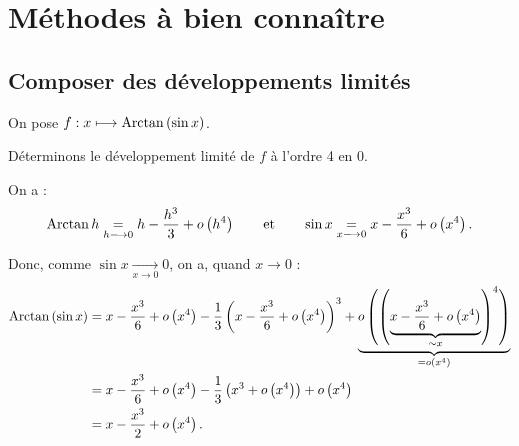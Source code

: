 \section{Méthodes à bien connaître}

\subsection{Composer des développements limités}

\begin{ex}
On pose \(f:x\longmapsto\operatorname{Arctan}\left(\sin x\right)\).

Déterminons le développement limité de \(f\) à l'ordre 4 en \(0\).

On a : \[\operatorname{Arctan} h\underset{h\longrightarrow0}{=}h-\dfrac{h^3}{3}+o\left(h^4\right)\qquad\text{et}\qquad\sin x\underset{x\longrightarrow0}{=}x-\dfrac{x^3}{6}+o\left(x^4\right).\]

Donc, comme \(\sin x\xrightarrow[x\to0]{}0\), on a, quand \(x\to0\) : \[\begin{aligned}
\operatorname{Arctan}\left(\sin x\right)&=x-\dfrac{x^3}{6}+o\left(x^4\right)-\dfrac{1}{3}\left(x-\dfrac{x^3}{6}+o\left(x^4\right)\right)^3+\underbrace{o\left(\left(\underbrace{x-\dfrac{x^3}{6}+o\left(x^4\right)}_{\sim x}\right)^4\right)}_{=o\left(x^4\right)} \\
&=x-\dfrac{x^3}{6}+o\left(x^4\right)-\dfrac{1}{3}\left(x^3+o\left(x^4\right)\right)+o\left(x^4\right) \\
&=x-\dfrac{x^3}{2}+o\left(x^4\right).
\end{aligned}\]
\end{ex}
